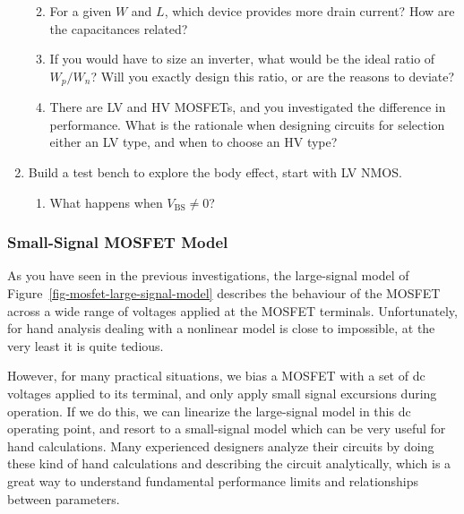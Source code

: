 \documentclass[
  a4paper,
  DIV=11,
  numbers=noendperiod]{scrartcl}
\providecommand{\tightlist}{%
  \setlength{\itemsep}{0pt}\setlength{\parskip}{0pt}}\usepackage{longtable,booktabs,array}
\begin{document}
\begin{tcolorbox}
\begin{enumerate}
  \begin{enumerate}
  \def\labelenumii{\arabic{enumii}.}
  \tightlist
  \item
    For a given \(W\) and \(L\), which device provides more drain
    current? How are the capacitances related?
  \item
    If you would have to size an inverter, what would be the ideal ratio
    of \(W_p/W_n\)? Will you exactly design this ratio, or are the
    reasons to deviate?
  \item
    There are LV and HV MOSFETs, and you investigated the difference in
    performance. What is the rationale when designing circuits for
    selection either an LV type, and when to choose an HV type?
  \end{enumerate}
\item
  Build a test bench to explore the body effect, start with LV NMOS.

  \begin{enumerate}
  \def\labelenumii{\arabic{enumii}.}
  \tightlist
  \item
    What happens when \(V_\mathrm{BS} \neq 0\)?
  \end{enumerate}
\end{enumerate}

\end{tcolorbox}

\subsubsection{Small-Signal MOSFET
Model}\label{sec-mosfet-smallsignal-model}

As you have seen in the previous investigations, the large-signal model
of Figure~\ref{fig-mosfet-large-signal-model} describes the behaviour of
the MOSFET across a wide range of voltages applied at the MOSFET
terminals. Unfortunately, for hand analysis dealing with a nonlinear
model is close to impossible, at the very least it is quite tedious.

However, for many practical situations, we bias a MOSFET with a set of
dc voltages applied to its terminal, and only apply small signal
excursions during operation. If we do this, we can linearize the
large-signal model in this dc operating point, and resort to a
small-signal model which can be very useful for hand calculations. Many
experienced designers analyze their circuits by doing these kind of hand
calculations and describing the circuit analytically, which is a great
way to understand fundamental performance limits and relationships
between parameters.
\end{document}
